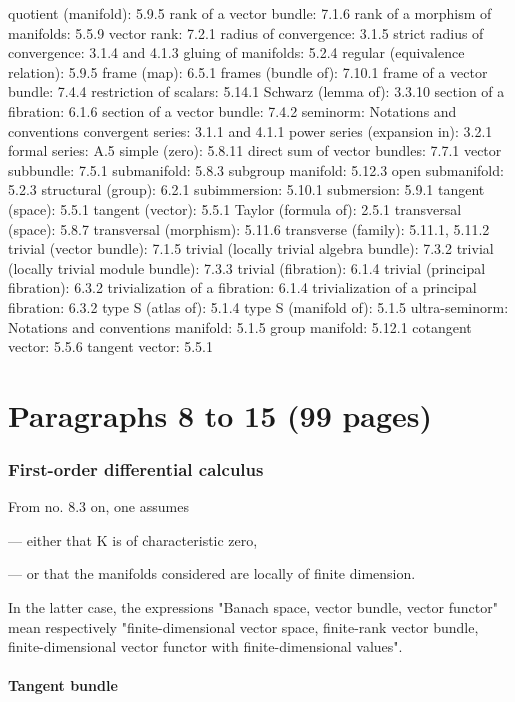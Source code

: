 quotient (manifold): 5.9.5 rank of a vector bundle: 7.1.6 rank of a morphism of manifolds: 5.5.9 vector rank: 7.2.1 radius of convergence: 3.1.5 strict radius of convergence: 3.1.4 and 4.1.3 gluing of manifolds: 5.2.4 regular (equivalence relation): 5.9.5 frame (map): 6.5.1 frames (bundle of): 7.10.1 frame of a vector bundle: 7.4.4 restriction of scalars: 5.14.1 Schwarz (lemma of): 3.3.10 section of a fibration: 6.1.6 section of a vector bundle: 7.4.2 seminorm: Notations and conventions convergent series: 3.1.1 and 4.1.1 power series (expansion in): 3.2.1 formal series: A.5 simple (zero): 5.8.11 direct sum of vector bundles: 7.7.1 vector subbundle: 7.5.1 submanifold: 5.8.3 subgroup manifold: 5.12.3 open submanifold: 5.2.3 structural (group): 6.2.1 subimmersion: 5.10.1 submersion: 5.9.1 tangent (space): 5.5.1 tangent (vector): 5.5.1 Taylor (formula of): 2.5.1 transversal (space): 5.8.7 transversal (morphism): 5.11.6 transverse (family): 5.11.1, 5.11.2 trivial (vector bundle): 7.1.5 trivial (locally trivial algebra bundle): 7.3.2 trivial (locally trivial module bundle): 7.3.3 trivial (fibration): 6.1.4 trivial (principal fibration): 6.3.2 trivialization of a fibration: 6.1.4 trivialization of a principal fibration: 6.3.2 type S (atlas of): 5.1.4 type S (manifold of): 5.1.5 ultra-seminorm: Notations and conventions manifold: 5.1.5 group manifold: 5.12.1 cotangent vector: 5.5.6 tangent vector: 5.5.1


\part{Paragraphs 8 to 15 (99 pages)}

\setcounter{section}{7}

\section{First-order differential calculus}

From no. 8.3 on, one assumes

--- either that K is of characteristic zero,

--- or that the manifolds considered are locally of finite dimension.

In the latter case, the expressions "Banach space, vector bundle, vector functor" mean respectively "finite-dimensional vector space, finite-rank vector bundle, finite-dimensional vector functor with finite-dimensional values".

\subsection{Tangent bundle}

